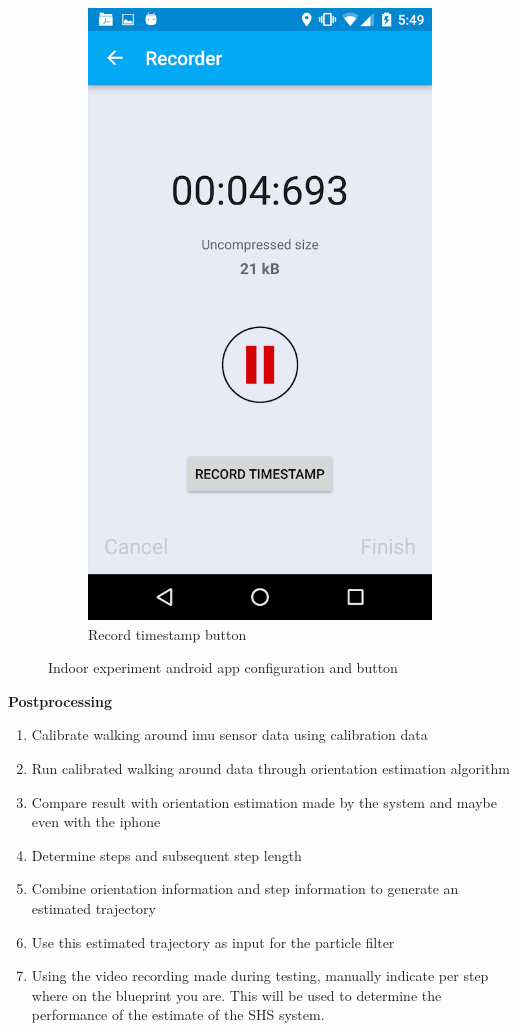 \begin{figure}[H]
\begin{subfigure}[t]{.45\textwidth}
		\includegraphics[width=0.7\linewidth]{images/recording_timestamp_button}
		\caption{Record timestamp button}
		\label{fig:recording_timestamp_button}
	\end{subfigure}
\caption{Indoor experiment android app configuration and button}
\end{figure}


\textbf{Postprocessing}

\begin{enumerate}
	\def\labelenumi{\arabic{enumi}.}
	\tightlist
	\item
	Calibrate walking around imu sensor data using calibration data
	\item
	Run calibrated walking around data through orientation estimation
	algorithm
	\item
	Compare result with orientation estimation made by the system and
	maybe even with the iphone 
	\item
	Determine steps and subsequent step length 
	\item
	Combine orientation information and step information to generate an
	estimated trajectory
	\item
	Use this estimated trajectory as input for the particle filter
	\item
	Using the video recording made during testing, manually indicate per
	step where on the blueprint you are. This will be used to determine
	the performance of the estimate of the SHS system. 
\end{enumerate}

